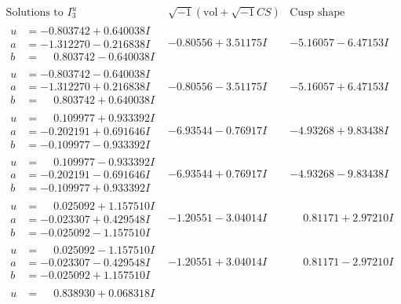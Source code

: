 \documentclass[1p]{elsarticle_modified}
\theoremstyle{definition}
\newcommand{\I}{\sqrt{-1}}
\begin{document}
$$\begin{array}{c|c|c}  
\text{Solutions to }I^u_{3}& \I (\text{vol} + \sqrt{-1}CS) & \text{Cusp shape}\\
 \hline 
\begin{aligned}
u &= -0.803742 + 0.640038 I \\
a &= -1.312270 - 0.216838 I \\
b &= \phantom{-}0.803742 - 0.640038 I\end{aligned}
 & -0.80556 + 3.51175 I & -5.16057 - 6.47153 I \\ \hline\begin{aligned}
u &= -0.803742 - 0.640038 I \\
a &= -1.312270 + 0.216838 I \\
b &= \phantom{-}0.803742 + 0.640038 I\end{aligned}
 & -0.80556 - 3.51175 I & -5.16057 + 6.47153 I \\ \hline\begin{aligned}
u &= \phantom{-}0.109977 + 0.933392 I \\
a &= -0.202191 + 0.691646 I \\
b &= -0.109977 - 0.933392 I\end{aligned}
 & -6.93544 - 0.76917 I & -4.93268 + 9.83438 I \\ \hline\begin{aligned}
u &= \phantom{-}0.109977 - 0.933392 I \\
a &= -0.202191 - 0.691646 I \\
b &= -0.109977 + 0.933392 I\end{aligned}
 & -6.93544 + 0.76917 I & -4.93268 - 9.83438 I \\ \hline\begin{aligned}
u &= \phantom{-}0.025092 + 1.157510 I \\
a &= -0.023307 + 0.429548 I \\
b &= -0.025092 - 1.157510 I\end{aligned}
 & -1.20551 - 3.04014 I & \phantom{-}0.81171 + 2.97210 I \\ \hline\begin{aligned}
u &= \phantom{-}0.025092 - 1.157510 I \\
a &= -0.023307 - 0.429548 I \\
b &= -0.025092 + 1.157510 I\end{aligned}
 & -1.20551 + 3.04014 I & \phantom{-}0.81171 - 2.97210 I \\ \hline\begin{aligned}
u &= \phantom{-}0.838930 + 0.068318 I \\

\end{aligned}
\end{array}$$
\end{document}
